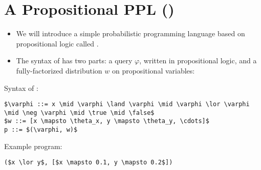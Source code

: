 \documentclass{tufte-handout}
\begin{document}
\section{A Propositional PPL (\prop{})}
\begin{itemize}
  \item We will introduce a simple probabilistic programming language based on 
  propositional logic called \prop{}.
  \item The syntax of \prop{} has two parts: a query $\varphi$, written in 
  propositional logic, and a fully-factorized distribution $w$ on propositional 
  variables:
\end{itemize}
Syntax of \prop{}:
\begin{lstlisting}[mathescape=true]
$\varphi ::= x \mid \varphi \land \varphi \mid \varphi \lor \varphi \mid \neg \varphi \mid \true \mid \false$ 
$w ::= [x \mapsto \theta_x, y \mapsto \theta_y, \cdots]$
p ::= $(\varphi, w)$
\end{lstlisting}

Example \prop{} program:

\begin{lstlisting}[mathescape=true]
($x \lor y$, [$x \mapsto 0.1, y \mapsto 0.2$])
\end{lstlisting}
\end{document}
